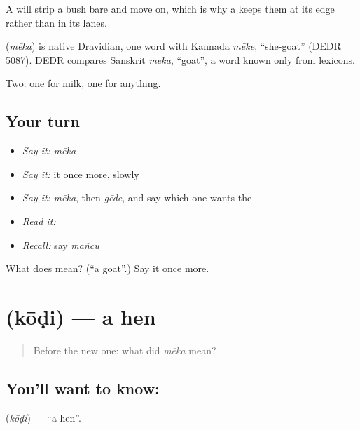 A  will strip a bush bare and move on, which is why a  keeps them at its edge rather than in its lanes.

\begin{cousinweb}
\textbf{} (\emph{mēka}) is native Dravidian, one word with Kannada \emph{mēke}, \textquotedblleft{}she-goat\textquotedblright{} (DEDR 5087). DEDR compares Sanskrit \emph{meka}, \textquotedblleft{}goat\textquotedblright{}, a word known only from lexicons.
\end{cousinweb}

\begin{grammarlens}[title={What you've built}]
Two: one for milk, one for anything.
\end{grammarlens}

\subsection*{Your turn}
\begin{itemize}
\raggedright
  \item \emph{Say it:} \emph{mēka}
  \item \emph{Say it:} it once more, slowly
  \item \emph{Say it:} \emph{mēka}, then \emph{gēde}, and say which one wants the 
  \item \emph{Read it:} \textbf{}
  \item \emph{Recall:} say \emph{mañcu}
\end{itemize}

\begin{tcolorbox}[breakable,colback=teal!4,colframe=teal!35!black,title={Before you move on}]
What does  mean? (\textquotedblleft{}a goat\textquotedblright{}.) Say it once more.
\end{tcolorbox}
\section[\texorpdfstring{\te{కోడి} (kōḍi)}{కోడి (kōḍi)}]{ (kōḍi) — a hen}

\label{lesson:TE-C60-hen}



\begin{quote}
Before the new one: what did \emph{mēka} mean?
\end{quote}

\subsection*{You'll want to know: }
\textbf{} (\emph{kōḍi}) — \textquotedblleft{}a hen\textquotedblright{}.

